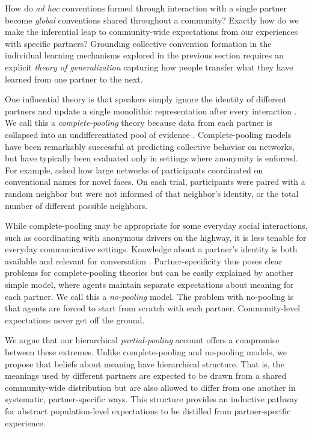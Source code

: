 
How do \emph{ad hoc} conventions formed through interaction with a single partner become \emph{global} conventions shared throughout a community?
Exactly how do we make the inferential leap to community-wide expectations from our experiences with specific partners? 
Grounding collective convention formation in the individual learning mechanisms explored in the previous section requires an explicit \emph{theory of generalization} capturing how people transfer what they have learned from one partner to the next.

One influential theory is that speakers simply ignore the identity of different partners and update a single monolithic representation after every interaction \cite{steels_self-organizing_1995,barr_establishing_2004,young_evolution_2015}.
We call this a \emph{complete-pooling} theory because data from each partner is collapsed into an undifferentiated pool of evidence \cite{gelman2006data}. 
Complete-pooling models have been remarkably successful at predicting collective behavior on networks, but have typically been evaluated only in settings where anonymity is enforced. 
For example,  asked how large networks of participants coordinated on conventional names for novel faces.
On each trial, participants were paired with a random neighbor but were not informed of that neighbor's identity, or the total number of different possible neighbors. 

While complete-pooling may be appropriate for some everyday social interactions, such as coordinating with anonymous drivers on the highway, it is less tenable for everyday communicative settings.
Knowledge about a partner's identity is both available and relevant for conversation \cite{eckert_three_2012, davidson_nice_1986}.
Partner-specificity thus poses clear problems for complete-pooling theories but can be easily explained by another simple model, where agents maintain separate expectations about meaning for each partner.
We call this a \emph{no-pooling} model.
The problem with no-pooling is that agents are forced to start from scratch with each partner.
Community-level expectations never get off the ground.

We argue that our hierarchical \emph{partial-pooling} account offers a compromise between these extremes.
Unlike complete-pooling and no-pooling models, we propose that beliefs about meaning have hierarchical structure.
That is, the meanings used by different partners are expected to be drawn from a shared community-wide distribution but are also allowed to differ from one another in systematic, partner-specific ways.
This structure provides an inductive pathway for abstract population-level expectations to be distilled from partner-specific experience.

